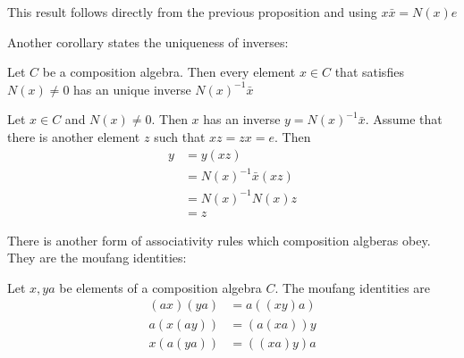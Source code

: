 \documentclass[../Thesis.tex]{subfiles}
\begin{document}
\begin{myproof}
This result follows directly from the previous proposition and using  $x \bar{x} = N(x)e$
\end{myproof}
Another corollary states the uniqueness of inverses:
\begin{Cor}
Let $C$ be a composition algebra. Then every element $x \in C$ that satisfies $N(x) \neq 0$ has an unique inverse $N(x)^{-1}\bar{x}$
\end{Cor}
\begin{myproof}
Let $x \in C$ and $N(x) \neq 0$. Then $x$ has an inverse $y = N(x)^{-1} \bar{x}$. Assume that there is another element $z$ such that $xz = zx = e$. Then
\begin{align*}
y &= y(xz) \\
  &= N(x)^{-1}\bar{x}(xz)\\
  &= N(x)^{-1}N(x)z \\
  &= z
\end{align*}
\end{myproof}
There is another form of associativity rules which composition algberas obey. They are the moufang identities:

\begin{mydef}
Let $x, y a$ be elements of a composition algebra $C$. The moufang identities are
\begin{align}
(ax)(ya) &= a((xy)a)\\
a(x(ay)) &= (a(xa))y\\
x(a(ya)) &= ((xa)y)a
\end{align}
\end{mydef}
\end{document}
